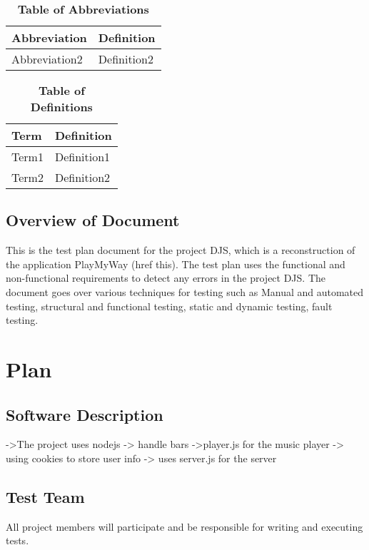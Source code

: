 \documentclass[12pt, titlepage]{article}
\begin{document}
\begin{table}[hbp]
\caption{\textbf{Table of Abbreviations}} \label{Table}

\begin{tabularx}{\textwidth}{p{3cm}X}
\toprule
\textbf{Abbreviation} & \textbf{Definition} \\
\midrule

Abbreviation2 & Definition2\\
\bottomrule
\end{tabularx}

\end{table}

\begin{table}[!htbp]
\caption{\textbf{Table of Definitions}} \label{Table}

\begin{tabularx}{\textwidth}{p{3cm}X}
\toprule
\textbf{Term} & \textbf{Definition}\\
\midrule
Term1 & Definition1\\
Term2 & Definition2\\
\bottomrule
\end{tabularx}

\end{table}	

\subsection{Overview of Document}
	This is the test plan document for the project DJS, which is a reconstruction of the application PlayMyWay (href this).
The test plan uses the functional and non-functional requirements to detect any errors in the project DJS.
The document goes over various techniques for testing such as Manual and automated testing, structural and
functional testing, static and dynamic testing, fault testing.

\section{Plan}
	
\subsection{Software Description}
->The project uses nodejs 
-> handle bars 
->player.js for the music player
-> using cookies to store user info
-> uses server.js for the server
\subsection{Test Team}
All project members will participate and be responsible for writing and executing tests.
\end{document}
